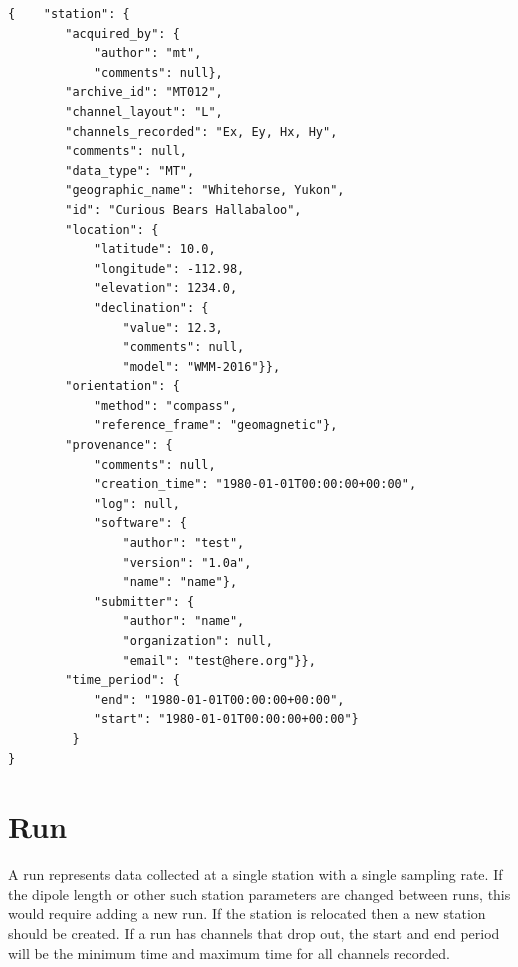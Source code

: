 \documentclass[12pt]{article}
\begin{document}
\begin{verbatim}
{    "station": {
        "acquired_by": {
            "author": "mt",
            "comments": null},
        "archive_id": "MT012",
        "channel_layout": "L",
        "channels_recorded": "Ex, Ey, Hx, Hy",
        "comments": null,
        "data_type": "MT",
        "geographic_name": "Whitehorse, Yukon",
        "id": "Curious Bears Hallabaloo",
        "location": {
            "latitude": 10.0,
            "longitude": -112.98,
            "elevation": 1234.0,
            "declination": {
                "value": 12.3,
                "comments": null,
                "model": "WMM-2016"}},
        "orientation": {
            "method": "compass",
            "reference_frame": "geomagnetic"},
        "provenance": {
            "comments": null,
            "creation_time": "1980-01-01T00:00:00+00:00",
            "log": null,
            "software": {
                "author": "test",
                "version": "1.0a",
                "name": "name"},
            "submitter": {
                "author": "name",
                "organization": null,
                "email": "test@here.org"}},
        "time_period": {
            "end": "1980-01-01T00:00:00+00:00",
            "start": "1980-01-01T00:00:00+00:00"}
         }
}
\end{verbatim}

\newpage
\section{Run}

A run represents data collected at a single station with a single sampling rate. If the dipole length or other such station parameters are changed between runs, this would require adding a new run.  If the station is relocated then a new station should be created.  If a run has channels that drop out, the start and end period will be the minimum time and maximum time for all channels recorded.  
\end{document}
